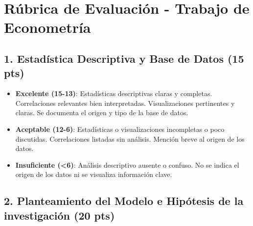 \documentclass{article}
\begin{document}
\section*{R\'ubrica de Evaluaci\'on - Trabajo de Econometría}

\subsection*{1. Estad\'istica Descriptiva y Base de Datos (15 pts)}
\begin{itemize}
  \item \textbf{Excelente (15-13)}: Estad\'isticas descriptivas claras y completas. Correlaciones relevantes bien interpretadas. Visualizaciones pertinentes y claras. Se documenta el origen y tipo de la base de datos.
  \item \textbf{Aceptable (12-6)}: Estad\'isticas o visualizaciones incompletas o poco discutidas. Correlaciones listadas sin an\'alisis. Menci\'on breve al origen de los datos.
  \item \textbf{Insuficiente (<6)}: An\'alisis descriptivo ausente o confuso. No se indica el origen de los datos ni se visualiza informaci\'on clave.
\end{itemize}

\subsection*{2. Planteamiento del Modelo e Hipótesis de la investigación (20 pts)}
\end{document}
